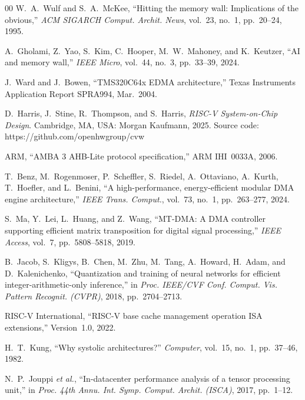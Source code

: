\documentclass[conference]{IEEEtran}
\begin{document}
\begin{thebibliography}{00}
    W.~A.~Wulf and S.~A.~McKee, ``Hitting the memory wall: Implications
    of the obvious,'' \textit{ACM SIGARCH Comput. Archit. News}, vol.~23,
    no.~1, pp.~20--24, 1995.

    A.~Gholami, Z.~Yao, S.~Kim, C.~Hooper, M.~W.~Mahoney, and K.~Keutzer,
    ``AI and memory wall,'' \textit{IEEE Micro}, vol.~44, no.~3,
    pp.~33--39, 2024.

    J.~Ward and J.~Bowen, ``TMS320C64x EDMA architecture,'' Texas
    Instruments Application Report SPRA994, Mar.\ 2004.

    D.~Harris, J.~Stine, R.~Thompson, and S.~Harris, \textit{RISC-V
    System-on-Chip Design}. Cambridge, MA, USA: Morgan Kaufmann, 2025.
    Source code: https://github.com/openhwgroup/cvw

    ARM, ``AMBA 3 AHB-Lite protocol specification,'' ARM IHI~0033A, 2006.

    T.~Benz, M.~Rogenmoser, P.~Scheffler, S.~Riedel, A.~Ottaviano,
    A.~Kurth, T.~Hoefler, and L.~Benini, ``A high-performance,
    energy-efficient modular DMA engine architecture,'' \textit{IEEE
    Trans. Comput.}, vol.~73, no.~1, pp.~263--277, 2024.

    S.~Ma, Y.~Lei, L.~Huang, and Z.~Wang, ``MT-DMA: A DMA controller
    supporting efficient matrix transposition for digital signal
    processing,'' \textit{IEEE Access}, vol.~7, pp.~5808--5818, 2019.

    B.~Jacob, S.~Kligys, B.~Chen, M.~Zhu, M.~Tang, A.~Howard, H.~Adam,
    and D.~Kalenichenko, ``Quantization and training of neural networks
    for efficient integer-arithmetic-only inference,'' in \textit{Proc.
    IEEE/CVF Conf. Comput. Vis. Pattern Recognit. (CVPR)}, 2018,
    pp.~2704--2713.

    RISC-V International, ``RISC-V base cache management operation ISA
    extensions,'' Version~1.0, 2022.

    H.~T.~Kung, ``Why systolic architectures?'' \textit{Computer},
    vol.~15, no.~1, pp.~37--46, 1982.

    N.~P.~Jouppi \textit{et al.}, ``In-datacenter performance analysis of
    a tensor processing unit,'' in \textit{Proc. 44th Annu. Int. Symp.
    Comput. Archit. (ISCA)}, 2017, pp.~1--12.


\end{thebibliography}
\end{document}
